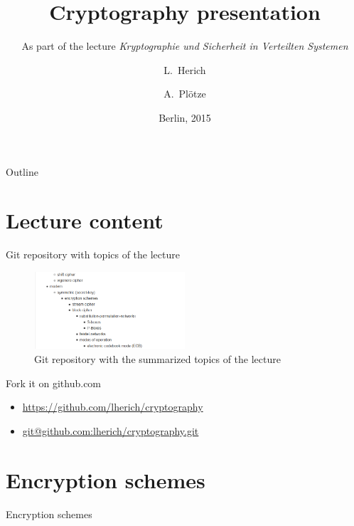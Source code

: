 \documentclass[ucs,9pt]{beamer}
\title{Cryptography presentation}
\subtitle{As part of the lecture \textit{Kryptographie und Sicherheit in Verteilten Systemen}}
\author{L.~Herich \and A.~Plötze}
\institute[FU Berlin]{Freie Universität Berlin}
\date{Berlin, 2015}
\begin{document}
\begin{frame}[plain]
  \titlepage
\end{frame}

\begin{frame}{Outline}
  \tableofcontents
\end{frame}


\section{Lecture content}

\begin{frame}{Git repository with topics of the lecture}
    \begin{figure}[h]
        \centering
        \includegraphics[width=0.5\textwidth]{figures/list_of_content.png}
        \caption{Git repository with the summarized topics of the lecture}
    \end{figure}
    \begin{block}{Fork it on github.com}
        \begin{itemize}
            \item 
            \url{https://github.com/lherich/cryptography}
            \item
            \url{git@github.com:lherich/cryptography.git}
        \end{itemize}
    \end{block}
\end{frame}


\section{Encryption schemes}
\begin{frame}
    \centering
    \huge{Encryption schemes}
\end{frame}
\end{document}
